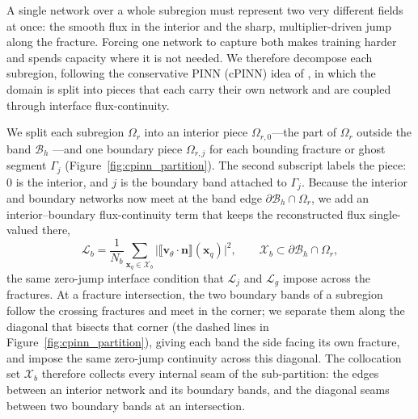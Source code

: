 \documentclass[a4paper,fleqn]{cas-sc}
\newcommand{\jump}[1]{\lBrack #1 \rBrack}
\newcommand{\vflux}{\mathbf{v}}
\begin{document}
A single network over a whole subregion must represent two very different fields
at once: the smooth flux in the interior and the sharp, multiplier-driven jump
along the fracture. Forcing one network to capture both makes training harder and
spends capacity where it is not needed. We therefore decompose each subregion,
following the conservative PINN (cPINN) idea of \citet{Jagtap2020}, in which the
domain is split into pieces that each carry their own network and are coupled
through interface flux-continuity.

We split each subregion \(\Omega_r\) into an interior piece \(\Omega_{r,0}\)---the
part of \(\Omega_r\) outside the band \(\mathcal{B}_h\) ---and one boundary piece \(\Omega_{r,j}\) for each bounding
fracture or ghost segment \(\Gamma_j\) (Figure~\ref{fig:cpinn_partition}). The
second subscript labels the piece: \(0\) is the interior, and \(j\) is the
boundary band attached to \(\Gamma_j\). Because the interior and boundary networks
now meet at the band edge \(\partial\mathcal{B}_h\cap\Omega_r\), we add an
interior--boundary flux-continuity term that keeps the reconstructed flux
single-valued there,
\begin{equation}
\mathcal{L}_b
=
\frac{1}{N_b}\sum_{\mathbf{x}_q\in\mathcal{X}_b}
\bigl|\jump{\vflux_\theta\cdot\mathbf{n}}(\mathbf{x}_q)\bigr|^2 ,
\qquad
\mathcal{X}_b\subset\partial\mathcal{B}_h\cap\Omega_r ,
\label{eq:pinn_band_continuity}
\end{equation}
the same zero-jump interface condition that \(\mathcal{L}_j\) and \(\mathcal{L}_g\)
impose across the fractures. At a fracture intersection, the two boundary bands of a
subregion follow the crossing fractures and meet in the corner; we separate them
along the diagonal that bisects that corner (the dashed lines in
Figure~\ref{fig:cpinn_partition}), giving each band the side facing its own
fracture, and impose the same zero-jump continuity across this diagonal. The
collocation set \(\mathcal{X}_b\) therefore collects every internal seam of the
sub-partition: the edges between an interior network and its boundary bands, and
the diagonal seams between two boundary bands at an intersection.
\end{document}
